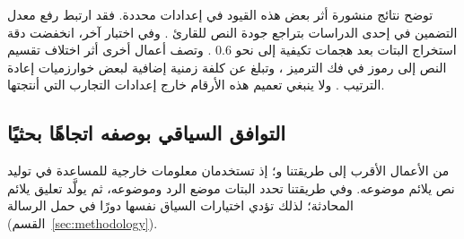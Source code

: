 توضح نتائج منشورة أثر بعض هذه القيود في إعدادات محددة. فقد ارتبط رفع معدل التضمين في إحدى الدراسات بتراجع جودة النص للقارئ \cite{yang2020vae}. وفي اختبار آخر، انخفضت دقة استخراج البتات بعد هجمات تكيفية إلى نحو 0.6 \cite{ji2024principled}. وتصف أعمال أخرى أثر اختلاف تقسيم النص إلى رموز في فك الترميز \cite{kaptchuk2021meteor}، وتبلغ عن كلفة زمنية إضافية لبعض خوارزميات إعادة الترتيب \cite{ding2023discop}. ولا ينبغي تعميم هذه الأرقام خارج إعدادات التجارب التي أنتجتها.

\subsection{التوافق السياقي بوصفه اتجاهًا بحثيًا}
\label{sec:related-contextual-compatibility}

من الأعمال الأقرب إلى طريقتنا  و؛ إذ تستخدمان معلومات خارجية للمساعدة في توليد نص يلائم موضوعه.
وفي طريقتنا تحدد البتات موضع الرد وموضوعه، ثم يولَّد تعليق يلائم المحادثة؛ لذلك تؤدي اختيارات السياق نفسها دورًا في حمل الرسالة (القسم~\ref{sec:methodology}).
